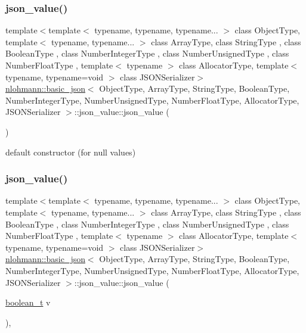 \subsubsection{\texorpdfstring{json\+\_\+value()}{json\_value()}\hspace{0.1cm}{\footnotesize\ttfamily [1/12]}}
{\footnotesize\ttfamily template$<$template$<$ typename, typename, typename... $>$ class Object\+Type, template$<$ typename, typename... $>$ class Array\+Type, class String\+Type , class Boolean\+Type , class Number\+Integer\+Type , class Number\+Unsigned\+Type , class Number\+Float\+Type , template$<$ typename $>$ class Allocator\+Type, template$<$ typename, typename=void $>$ class J\+S\+O\+N\+Serializer$>$ \\
\hyperlink{classnlohmann_1_1basic__json}{nlohmann\+::basic\+\_\+json}$<$ Object\+Type, Array\+Type, String\+Type, Boolean\+Type, Number\+Integer\+Type, Number\+Unsigned\+Type, Number\+Float\+Type, Allocator\+Type, J\+S\+O\+N\+Serializer $>$\+::json\+\_\+value\+::json\+\_\+value (\begin{DoxyParamCaption}{ }\end{DoxyParamCaption})\hspace{0.3cm}{\ttfamily [default]}}



default constructor (for null values) 

\mbox{\label{unionnlohmann_1_1basic__json_1_1json__value_a2538617eb31ab405a3d4dd7b4a824654}} 
\subsubsection{\texorpdfstring{json\+\_\+value()}{json\_value()}\hspace{0.1cm}{\footnotesize\ttfamily [2/12]}}
{\footnotesize\ttfamily template$<$template$<$ typename, typename, typename... $>$ class Object\+Type, template$<$ typename, typename... $>$ class Array\+Type, class String\+Type , class Boolean\+Type , class Number\+Integer\+Type , class Number\+Unsigned\+Type , class Number\+Float\+Type , template$<$ typename $>$ class Allocator\+Type, template$<$ typename, typename=void $>$ class J\+S\+O\+N\+Serializer$>$ \\
\hyperlink{classnlohmann_1_1basic__json}{nlohmann\+::basic\+\_\+json}$<$ Object\+Type, Array\+Type, String\+Type, Boolean\+Type, Number\+Integer\+Type, Number\+Unsigned\+Type, Number\+Float\+Type, Allocator\+Type, J\+S\+O\+N\+Serializer $>$\+::json\+\_\+value\+::json\+\_\+value (\begin{DoxyParamCaption}\item[{\hyperlink{classnlohmann_1_1basic__json_a4c919102a9b4fe0d588af64801436082}{boolean\+\_\+t}}]{v }\end{DoxyParamCaption})\hspace{0.3cm}{\ttfamily [inline]}, {\ttfamily [noexcept]}}



